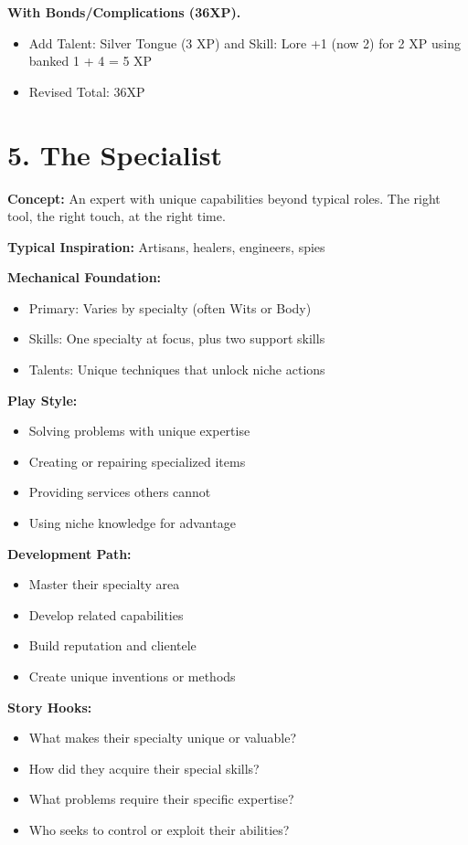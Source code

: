 \documentclass[11pt,twoside,openany]{book}
\begin{document}
\textbf{With Bonds/Complications (36XP).}
\begin{itemize}
\item Add Talent: Silver Tongue (3 XP) and Skill: Lore +1 (now 2) for 2 XP using banked 1 + 4 = 5 XP
\item Revised Total: 36XP
\end{itemize}

\section*{5. The Specialist} 

\textbf{Concept:} An expert with unique capabilities beyond typical roles. The right tool, the right touch, at the right time.

\textbf{Typical Inspiration:} Artisans, healers, engineers, spies

\textbf{Mechanical Foundation:}
\begin{itemize}
\item Primary: Varies by specialty (often Wits or Body)
\item Skills: One specialty at focus, plus two support skills
\item Talents: Unique techniques that unlock niche actions
\end{itemize}

\textbf{Play Style:}
\begin{itemize}
\item Solving problems with unique expertise
\item Creating or repairing specialized items
\item Providing services others cannot
\item Using niche knowledge for advantage
\end{itemize}

\textbf{Development Path:}
\begin{itemize}
\item Master their specialty area
\item Develop related capabilities
\item Build reputation and clientele
\item Create unique inventions or methods
\end{itemize}

\textbf{Story Hooks:}
\begin{itemize}
\item What makes their specialty unique or valuable?
\item How did they acquire their special skills?
\item What problems require their specific expertise?
\item Who seeks to control or exploit their abilities?
\end{itemize}
\end{document}
